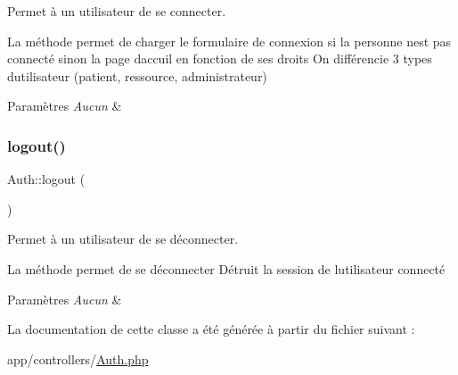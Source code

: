 Permet à un utilisateur de se connecter. 

La méthode permet de charger le formulaire de connexion si la personne n\textquotesingle{}est pas connecté sinon la page d\textquotesingle{}accuil en fonction de ses droits On différencie 3 types d\textquotesingle{}utilisateur (patient, ressource, administrateur) 
\begin{DoxyParams}{Paramètres}
{\em Aucun} & \\
\hline
\end{DoxyParams}
\mbox{\label{class_auth_acbbcb54916a234d1d816ec85e4a88d5e}} 
\subsubsection{\texorpdfstring{logout()}{logout()}}
{\footnotesize\ttfamily Auth\+::logout (\begin{DoxyParamCaption}{ }\end{DoxyParamCaption})}



Permet à un utilisateur de se déconnecter. 

La méthode permet de se déconnecter Détruit la session de l\textquotesingle{}utilisateur connecté 
\begin{DoxyParams}{Paramètres}
{\em Aucun} & \\
\hline
\end{DoxyParams}


La documentation de cette classe a été générée à partir du fichier suivant \+:\begin{DoxyCompactItemize}
\item 
app/controllers/\hyperlink{_auth_8php}{Auth.\+php}\end{DoxyCompactItemize}
